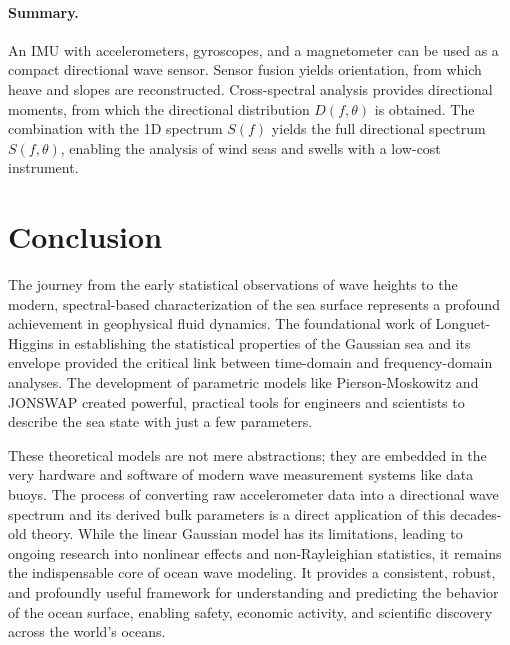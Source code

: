 \documentclass[11pt]{article}
\begin{document}
\paragraph{Summary.}
An IMU with accelerometers, gyroscopes, and a magnetometer can be used as a compact directional wave sensor. Sensor fusion yields orientation, from which heave and slopes are reconstructed. Cross-spectral analysis provides directional moments, from which the directional distribution $D(f,\theta)$ is obtained. The combination with the 1D spectrum $S(f)$ yields the full directional spectrum $S(f,\theta)$, enabling the analysis of wind seas and swells with a low-cost instrument.

\section{Conclusion}
The journey from the early statistical observations of wave heights to the modern, spectral-based characterization of the sea surface represents a profound achievement in geophysical fluid dynamics. The foundational work of Longuet-Higgins in establishing the statistical properties of the Gaussian sea and its envelope provided the critical link between time-domain and frequency-domain analyses. The development of parametric models like Pierson-Moskowitz and JONSWAP created powerful, practical tools for engineers and scientists to describe the sea state with just a few parameters.

These theoretical models are not mere abstractions; they are embedded in the very hardware and software of modern wave measurement systems like data buoys. The process of converting raw accelerometer data into a directional wave spectrum and its derived bulk parameters is a direct application of this decades-old theory. While the linear Gaussian model has its limitations, leading to ongoing research into nonlinear effects and non-Rayleighian statistics, it remains the indispensable core of ocean wave modeling. It provides a consistent, robust, and profoundly useful framework for understanding and predicting the behavior of the ocean surface, enabling safety, economic activity, and scientific discovery across the world's oceans.
\end{document}
